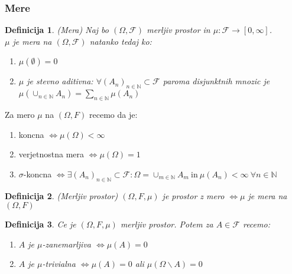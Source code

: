 \documentclass[a4paper,12pt]{article}
\newtheorem{definicija}{Definicija}
\newcommand{\N}{\mathbb{N}}
\newcommand{\F}{\mathcal{F}}
\begin{document}
        \subsubsection{Mere}
            \begin{definicija}(Mera)
                Naj bo $\left( \Omega, \F \right)$ merljiv prostor in $\mu: \F \rightarrow [0, \infty] $. \\
                $\mu$ je mera na $\left( \Omega, \F \right)$ natanko tedaj ko: 
                \begin{enumerate}
                    \item $\mu(\emptyset) = 0$
                    \item $\mu$ je stevno aditivna: $\forall (A_n)_{n \in \N} \subset \F$ paroma disjunktnih mnozic je $\mu(\cup_{n \in \N} A_n) = \sum_{n \in \N} \mu(A_n)$
                \end{enumerate}
            \end{definicija}

            Za mero $\mu$ na $\left( \Omega, F \right)$ recemo da je: 
            \begin{enumerate}
                \item koncna $\iff \mu(\Omega) < \infty$
                \item verjetnostna mera $\iff \mu(\Omega) = 1$
                \item $\sigma$-koncna $\iff \exists (A_n)_{n \in \N} \subset \F: \Omega = \cup_{m \in \N} A_m \ \text{in} \ \mu(A_n) < \infty \ \forall n \in \N$
            \end{enumerate}

            \begin{definicija}(Merljiv prostor)
                $\left( \Omega, F, \mu \right)$ je prostor z mero $\iff \mu$ je mera na $(\Omega, F)$
            \end{definicija}

            \begin{definicija}
                Ce je $\left( \Omega, F, \mu \right)$ merljiv prostor. Potem za $A \in \F$ recemo:
                \begin{enumerate}
                    \item $A$ je $\mu$-zanemarljiva $\iff \mu(A) = 0$
                    \item $A$ je $\mu$-trivialna $\iff \mu(A) = 0$ ali $\mu(\Omega\backslash A) = 0$
                \end{enumerate}
            \end{definicija}
\end{document}
